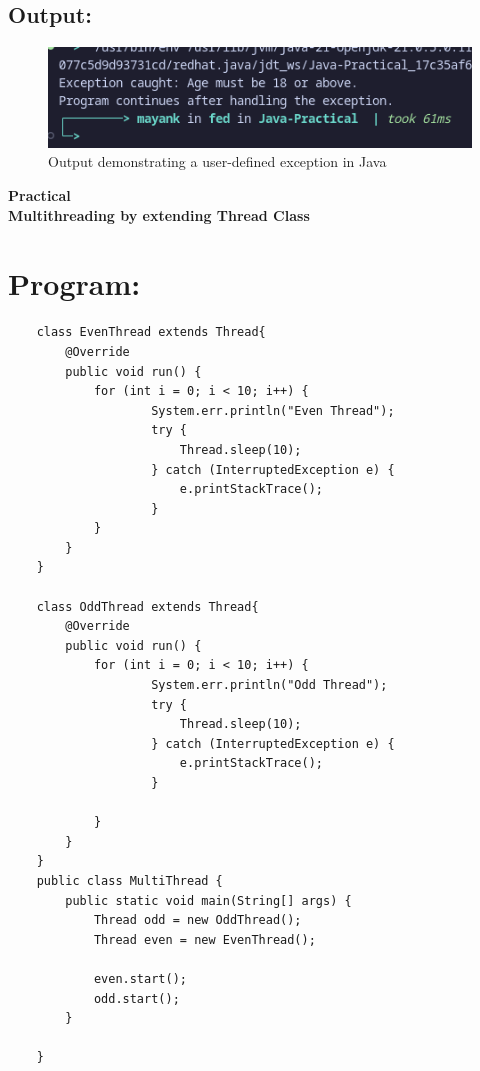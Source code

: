 \documentclass[a4paper,12pt]{article}
\newcounter{practicalno} %
\newcommand{\practicaltitle}[1]{
    \stepcounter{practicalno} %
    \newpage
    \begin{center}
        \vspace{1cm}
        \Large\textbf{Practical \thepracticalno} \\
        \vspace{0.5cm}
        \Large\textbf{#1} %
        \normalsize\vspace{1cm}
    \end{center}
}
\begin{document}
\subsection{Output:}
\begin{figure}[H]
    \centering
    \includegraphics[width=0.8\linewidth]{images/31.png}
    \caption{Output demonstrating a user-defined exception in Java}
\end{figure}

\setcounter{section}{0}
\practicaltitle{Multithreading by extending Thread Class}

\section{Program: }
\begin{lstlisting}
    class EvenThread extends Thread{
        @Override
        public void run() {
            for (int i = 0; i < 10; i++) {
                    System.err.println("Even Thread");
                    try {
                        Thread.sleep(10);
                    } catch (InterruptedException e) {
                        e.printStackTrace();
                    }
            }
        }
    }
    
    class OddThread extends Thread{
        @Override
        public void run() {
            for (int i = 0; i < 10; i++) {
                    System.err.println("Odd Thread");
                    try {
                        Thread.sleep(10);
                    } catch (InterruptedException e) {
                        e.printStackTrace();
                    }
                
            }
        }
    }
    public class MultiThread {
        public static void main(String[] args) {
            Thread odd = new OddThread();
            Thread even = new EvenThread();
    
            even.start();
            odd.start();
        }
        
    }
\end{lstlisting}
\end{document}
